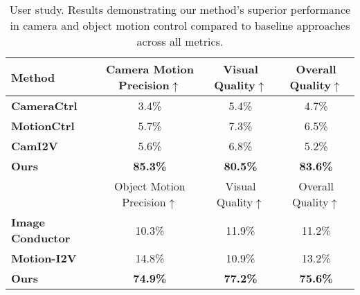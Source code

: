 \setlength{\tabcolsep}{1pt}
\begin{table}[]
\vspace{-5pt}
\scriptsize
\centering
\begin{tabular}{lccc}
\toprule
\textbf{Method}          & Camera Motion Precision$\uparrow$ & Visual Quality$\uparrow$ & Overall Quality$\uparrow$ \\
\midrule
\textbf{CameraCtrl}      & 3.4\%                              & 5.4\%                     & 4.7\%                      \\
\textbf{MotionCtrl}      & 5.7\%                              & 7.3\%                     & 6.5\%                      \\
\textbf{CamI2V}          & 5.6\%                              & 6.8\%                     & 5.2\%                      \\
\rowcolor[HTML]{EFEFEF} 
\textbf{Ours}            & \textbf{85.3\%}                    & \textbf{80.5\%}           & \textbf{83.6\%}            \\
\midrule
                         & Object Motion Precision$\uparrow$          & Visual Quality$\uparrow$          & Overall Quality$\uparrow$          \\
\midrule
\textbf{Image Conductor} & 10.3\%                            & 11.9\%                   & 11.2\%                    \\
\textbf{Motion-I2V}      & 14.8\%                            & 10.9\%                   & 13.2\%                    \\
\rowcolor[HTML]{EFEFEF} 
\textbf{Ours}            & \textbf{74.9\%}                   & \textbf{77.2\%}          & \textbf{75.6\%}    \\
\bottomrule
\end{tabular}
\caption{User study. Results demonstrating our method's superior performance in camera and object motion control compared to baseline approaches across all metrics.}
\label{tab:user_study}
\vspace{-5pt}
\end{table}

